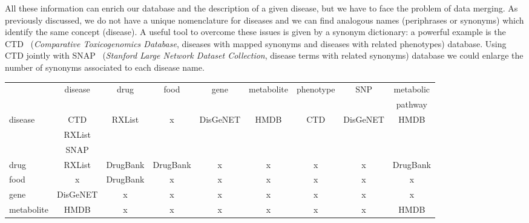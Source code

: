 \documentclass{standalone}
\begin{document}
All these information can enrich our database and the description of a given disease, but we have to face the problem of data merging.
As previously discussed, we do not have a unique nomenclature for diseases and we can find analogous names (periphrases or synonyms) which identify the same concept (disease).
A useful tool to overcome these issues is given by a synonym dictionary: a powerful example is the CTD~\cite{CTDdb} (\emph{Comparative Toxicogenomics Database},  diseases with mapped synonyms and  diseases with related phenotypes) database.
Using CTD jointly with SNAP~\cite{biosnapnets} (\emph{Stanford Large Network Dataset Collection},  disease terms with related synonyms) database we could enlarge the number of synonyms associated to each disease name.

\begin{table}
\hspace{-2cm}
\begin{tabular}{lcccccccc}
\hline\rowcolor{darkgrayrow}
                        & disease             & drug     & food     & gene     & metabolite & phenotype & SNP      & metabolic \\
\rowcolor{darkgrayrow}
                        &                     &          &          &          &            &           &          & pathway   \\
disease                 & CTD                 & RXList   &    x     & DisGeNET &  HMDB      & CTD       & DisGeNET & HMDB      \\
                        & RXList              &          &          &          &            &           &          &           \\
                        & SNAP                &          &          &          &            &           &          &           \\
drug                    &       RXList        & DrugBank & DrugBank &    x     &    x       &    x      &     x    & DrugBank  \\
food                    &          x          & DrugBank &    x     &    x     &    x       &    x      &     x    &    x      \\
gene                    &      DisGeNET       &    x     &    x     &    x     &    x       &    x      &     x    &    x      \\
metabolite              &       HMDB          &    x     &    x     &    x     &    x       &    x      &     x    & HMDB      \\

\end{tabular}
\end{table}
\end{document}

